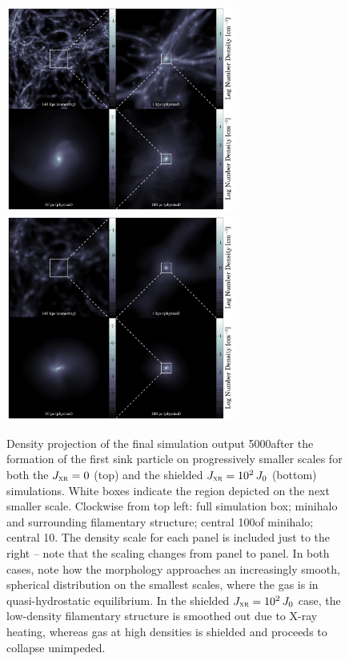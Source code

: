 \documentclass[../thesis.tex]{subfiles}
\begin{document}
\begin{figure}
  \begin{center}
    \includegraphics[width=0.67\textwidth]{figures/structure/structure-vanilla_t0}
    \includegraphics[width=0.67\textwidth]{figures/structure/structure-xr_tau2_J2_t0}
    \caption{Density projection of the final simulation output 5000\yr after the formation of the first sink particle on progressively smaller scales for both the $J_{\textsc{xr}}=0$ (top) and the shielded $J_{\textsc{xr}}=10^2\,J_0$ (bottom) simulations.  White boxes indicate the region depicted on the next smaller scale.  Clockwise from top left: full simulation box; minihalo and surrounding filamentary structure; central 100\pc of minihalo; central 10\pc.  The density scale for each panel is included just to the right -- note that the scaling changes from panel to panel. In both cases, note how the morphology approaches an increasingly smooth, spherical distribution on the smallest scales, where the gas is in quasi-hydrostatic equilibrium.  In the shielded $J_{\textsc{xr}}=10^2\,J_0$ case, the low-density filamentary structure is smoothed out due to X-ray heating, whereas gas at high densities is shielded and proceeds to collapse unimpeded.}
    \label{zoom-in}
  \end{center}
\end{figure}
\end{document}
